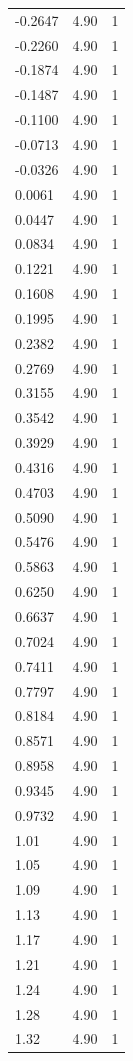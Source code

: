\begin{longtable}{lrr}
  -0.2647 & 4.90 & 1 \\
  -0.2260 & 4.90 & 1 \\
  -0.1874 & 4.90 & 1 \\
  -0.1487 & 4.90 & 1 \\
  -0.1100 & 4.90 & 1 \\
  -0.0713 & 4.90 & 1 \\
  -0.0326 & 4.90 & 1 \\
  0.0061 & 4.90 & 1 \\
  0.0447 & 4.90 & 1 \\
  0.0834 & 4.90 & 1 \\
  0.1221 & 4.90 & 1 \\
  0.1608 & 4.90 & 1 \\
  0.1995 & 4.90 & 1 \\
  0.2382 & 4.90 & 1 \\
  0.2769 & 4.90 & 1 \\
  0.3155 & 4.90 & 1 \\
  0.3542 & 4.90 & 1 \\
  0.3929 & 4.90 & 1 \\
  0.4316 & 4.90 & 1 \\
  0.4703 & 4.90 & 1 \\
  0.5090 & 4.90 & 1 \\
  0.5476 & 4.90 & 1 \\
  0.5863 & 4.90 & 1 \\
  0.6250 & 4.90 & 1 \\
  0.6637 & 4.90 & 1 \\
  0.7024 & 4.90 & 1 \\
  0.7411 & 4.90 & 1 \\
  0.7797 & 4.90 & 1 \\
  0.8184 & 4.90 & 1 \\
  0.8571 & 4.90 & 1 \\
  0.8958 & 4.90 & 1 \\
  0.9345 & 4.90 & 1 \\
  0.9732 & 4.90 & 1 \\
  1.01 & 4.90 & 1 \\
  1.05 & 4.90 & 1 \\
  1.09 & 4.90 & 1 \\
  1.13 & 4.90 & 1 \\
  1.17 & 4.90 & 1 \\
  1.21 & 4.90 & 1 \\
  1.24 & 4.90 & 1 \\
  1.28 & 4.90 & 1 \\
  1.32 & 4.90 & 1 \\

\end{longtable}
